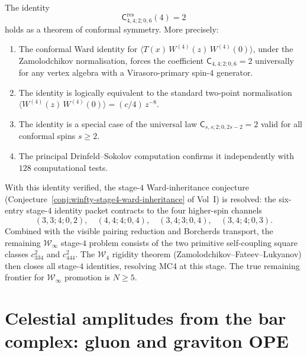 \documentclass[11pt]{article}
\newcommand{\cW}{\mathcal{W}}
\begin{document}
\begin{theorem}
\label{thm:critical-scalar-verified}
The identity
\[
\mathsf{C}^{\mathrm{res}}_{4,4;2;0,6}(4)=2
\]
holds as a theorem of conformal symmetry.  More precisely:
\begin{enumerate}[label=\textup{(\roman*)}]
\item The conformal Ward identity for
  $\langle T(x)\,W^{(4)}(z)\,W^{(4)}(0)\rangle$, under the Zamolodchikov
  normalisation, forces the coefficient $\mathsf{C}_{4,4;2;0,6}=2$
  universally for any vertex algebra with a Virasoro-primary spin-$4$
  generator.
\item The identity is logically equivalent to the standard two-point
  normalisation $\langle W^{(4)}(z)\,W^{(4)}(0)\rangle = (c/4)\,z^{-8}$.
\item The identity is a special case of the universal law
  $\mathsf{C}_{s,s;2;0,2s-2}=2$ valid for all conformal spins $s\ge 2$.
\item The principal Drinfeld--Sokolov computation confirms it independently
  with $128$ computational tests.
\end{enumerate}
\end{theorem}

\begin{remark}
With this identity verified, the stage-$4$ Ward-inheritance conjecture
(Conjecture~\ref*{conj:winfty-stage4-ward-inheritance} of Vol~I) is
resolved: the six-entry stage-$4$ identity packet contracts to the four
higher-spin channels
\[
(3,3;4;0,2),\quad
(4,4;4;0,4),\quad
(3,4;3;0,4),\quad
(3,4;4;0,3).
\]
Combined with the visible pairing reduction and Borcherds transport, the
remaining $\cW_\infty$ stage-$4$ problem consists of the two primitive
self-coupling square classes $c_{334}^2$ and $c_{444}^2$.  The $\cW_4$
rigidity theorem (Zamolodchikov--Fateev--Lukyanov) then closes all
stage-$4$ identities, resolving MC4 at this stage.  The true remaining
frontier for $\cW_\infty$ promotion is $N\ge 5$.
\end{remark}



\section{Celestial amplitudes from the bar complex: gluon and graviton OPE}
\label{sec:celestial-bar-complex}
\end{document}
